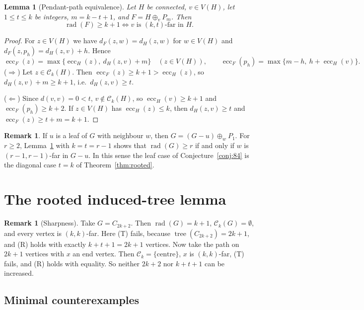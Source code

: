 \documentclass[11pt,a4paper]{article}
\newtheorem{lemma}[theorem]{Lemma}
\theoremstyle{definition}
\newtheorem{remark}[theorem]{Remark}
\newcommand{\rad}{\operatorname{rad}}
\newcommand{\ecc}{\operatorname{ecc}}
\newcommand{\tr}{\operatorname{tree}}
\newcommand{\C}{\mathcal{C}}
\newcommand{\plus}{\oplus}
\begin{document}
\begin{lemma}[Pendant-path equivalence]\label{lem:pendant}
Let $H$ be connected, $v\in V(H)$, let $1\le t\le k$ be integers, $m=k-t+1$, and $F=H\plus_v P_m$. Then
\[
\rad(F)\ge k+1 \iff v \text{ is } (k,t)\text{-far in } H .
\]
\end{lemma}

\begin{proof}
For $z\in V(H)$ we have $d_F(z,w)=d_H(z,w)$ for $w\in V(H)$ and $d_F(z,p_h)=d_H(z,v)+h$. Hence
\[
\ecc_F(z)=\max\{\ecc_H(z),\ d_H(z,v)+m\}\quad (z\in V(H)),\qquad \ecc_F(p_h)=\max\{m-h,\ h+\ecc_H(v)\}.
\]
($\Rightarrow$) Let $z\in\C_k(H)$. Then $\ecc_F(z)\ge k+1>\ecc_H(z)$, so $d_H(z,v)+m\ge k+1$, i.e.\ $d_H(z,v)\ge t$.

($\Leftarrow$) Since $d(v,v)=0<t$, $v\notin\C_k(H)$, so $\ecc_H(v)\ge k+1$ and $\ecc_F(p_h)\ge k+2$. If $z\in V(H)$ has $\ecc_H(z)\le k$, then $d_H(z,v)\ge t$ and $\ecc_F(z)\ge t+m=k+1$.
\end{proof}

\begin{remark}\label{rem:leaf}
If $u$ is a leaf of $G$ with neighbour $w$, then $G=(G-u)\plus_w P_1$. For $r\ge2$, Lemma~\ref{lem:pendant} with $k=t=r-1$ shows that $\rad(G)\ge r$ if and only if $w$ is $(r-1,r-1)$-far in $G-u$. In this sense the leaf case of Conjecture~\ref{conj:84} is the diagonal case $t=k$ of Theorem~\ref{thm:rooted}.
\end{remark}

\section{The rooted induced-tree lemma}\label{sec:rooted}

\begin{remark}[Sharpness]\label{rem:sharp}
Take $G=C_{2k+2}$. Then $\rad(G)=k+1$, $\C_k(G)=\emptyset$, and every vertex is $(k,k)$-far. Here (T) fails, because $\tr(C_{2k+2})=2k+1$, and (R) holds with exactly $k+t+1=2k+1$ vertices. Now take the path on $2k+1$ vertices with $x$ an end vertex. Then $\C_k=\{\text{centre}\}$, $x$ is $(k,k)$-far, (T) fails, and (R) holds with equality. So neither $2k+2$ nor $k+t+1$ can be increased.
\end{remark}

\subsection{Minimal counterexamples}
\end{document}
